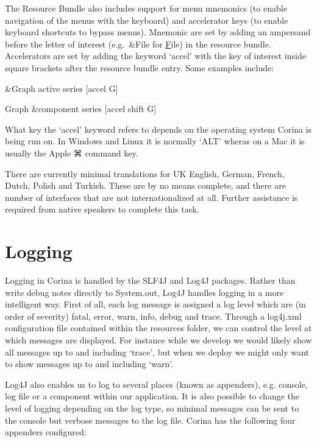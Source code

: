 The Resource Bundle also includes support for menu mnemonics (to enable navigation of the menus with the keyboard) and accelerator keys (to enable keyboard shortcuts to bypass menus).  Mnemonic are set by adding an ampersand before the letter of interest (e.g.\ {\&}File for \underline{F}ile) in the resource bundle.  Accelerators are set by adding the keyword `accel' with the key of interest inside square brackets after the resource bundle entry.  Some examples include:

\begin{itemize*}
 \item {\&}Graph active series [accel G]
 \item Graph {\&}component series [accel shift G]
\end{itemize*}

What key the `accel' keyword refers to depends on the operating system Corina is being run on.  In Windows and Linux it is normally `ALT' wheras on a Mac it is usually the Apple ⌘ command key. 


There are currently minimal translations for UK English, German, French, Dutch, Polish and Turkish.  These are by no means complete, and there are number of interfaces that are not internationalized at all.  Further assistance is required from native speakers to complete this task.

\section{Logging}
Logging in Corina is handled by the SLF4J and Log4J packages.  Rather than write debug notes directly to System.out, Log4J handles logging in a more intelligent way.  First of all, each log message is assigned a log level which are (in order of severity) fatal, error, warn, info, debug and trace.  Through a log4j.xml configuration file contained within the resources folder, we can control the level at which messages are displayed.  For instance while we develop we would likely show all messages up to and including `trace', but when we deploy we might only want to show messages up to and including `warn'. 

Log4J also enables us to log to several places (known as appenders), e.g. console, log file or a component within our application.  It is also possible to change the level of logging depending on the log type, so minimal messages can be sent to the console but verbose messages to the log file.  Corina has the following four appenders configured:

